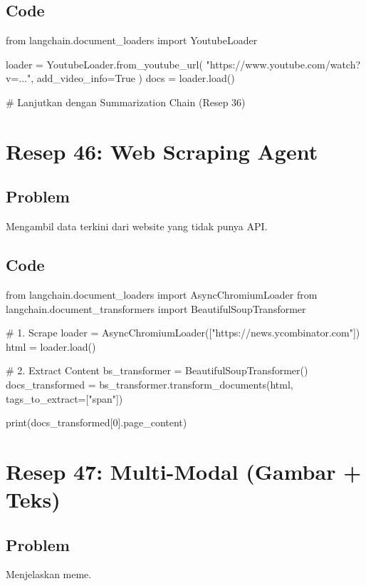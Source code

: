 \subsection*{Code}
\begin{codeblock}[language=Python]
from langchain.document_loaders import YoutubeLoader

loader = YoutubeLoader.from_youtube_url(
    "https://www.youtube.com/watch?v=...",
    add_video_info=True
)
docs = loader.load()

# Lanjutkan dengan Summarization Chain (Resep 36)
\end{codeblock}

\newpage

\section{Resep 46: Web Scraping Agent}

\subsection*{Problem}
Mengambil data terkini dari website yang tidak punya API.

\subsection*{Code}
\begin{codeblock}[language=Python]
from langchain.document_loaders import AsyncChromiumLoader
from langchain.document_transformers import BeautifulSoupTransformer

# 1. Scrape
loader = AsyncChromiumLoader(["https://news.ycombinator.com"])
html = loader.load()

# 2. Extract Content
bs_transformer = BeautifulSoupTransformer()
docs_transformed = bs_transformer.transform_documents(html, tags_to_extract=["span"])

print(docs_transformed[0].page_content)
\end{codeblock}

\newpage

\section{Resep 47: Multi-Modal (Gambar + Teks)}

\subsection*{Problem}
Menjelaskan meme.

